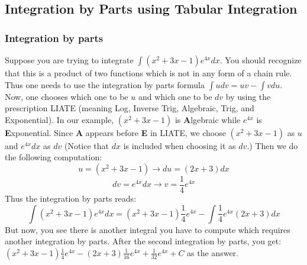\documentclass[12pt]{report}
\begin{document}
\begin{appendices}
	\chapter{Integration by Parts using Tabular Integration}
	\subsection*{Integration by parts}
	Suppose you are trying to integrate $\int (x^2+3x-1) e^{4x} dx$. You should recognize that this is a product of two functions which is not in any form of a chain rule. Thus one needs to use the integration by parts formula $\int u dv = uv -\int v du$.
	Now, one chooses which one to be $u$ and which one to be $dv$ by using the prescription LIATE (meaning Log, Inverse Trig, Algebraic, Trig, and Exponential). In our example, $(x^2+3x-1)$ is \textbf{A}lgebraic while $e^{4x}$ is \textbf{E}xponential. Since \textbf{A} appears before \textbf{E} in LIATE, we choose $(x^2+3x-1)$ as $u$ and $e^{4x}dx$ as $dv$ (Notice that $dx$ is included when choosing it as $dv$.)
	Then we do the following computation:
	$$u=(x^2+3x-1) \rightarrow du= (2x+3)dx $$
	$$dv= e^{4x}dx \rightarrow v= \frac{1}{4} e^{4x} $$
	Thus the integration by parts reads:
	$$\int (x^2+3x-1) e^{4x} dx = (x^2+3x-1)\frac{1}{4} e^{4x} - \int \frac{1}{4} e^{4x} (2x+3)dx $$
	But now, you see there is another integral you have to compute which requires another integration by parts. After the second integration by parts, you get: $ (x^2+3x-1)\frac{1}{4} e^{4x}-(2x+3)\frac{1}{16} e^{4x}+\frac{1}{32} e^{4x} +C$ as the answer.
	

\end{appendices}
\end{document}
